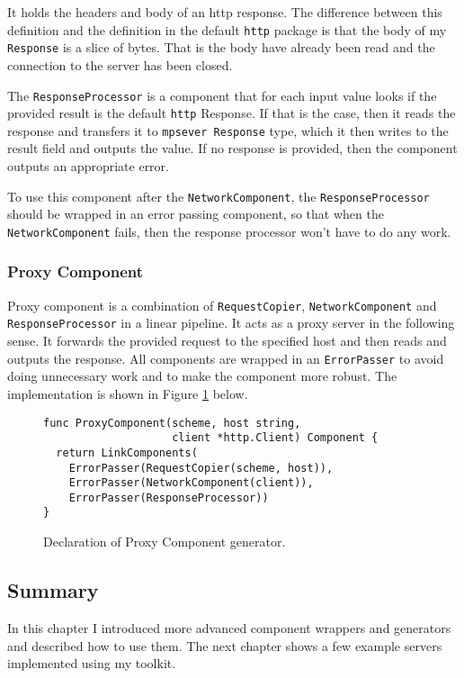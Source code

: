 It holds the headers and body of an http response. The difference between
this definition and the definition in the default \texttt{http} package is that
the body of my \texttt{Response} is a slice of bytes. 
That is the body have already been
read and the connection to the server has been closed.

The \texttt{ResponseProcessor} is a component that for each input value
looks if the provided result is the default \texttt{http} Response. 
If that is the case,
then it reads the response and transfers it to \texttt{mpsever Response} 
type, which it
then writes to the result field and outputs the value. If no response
is provided, then the component outputs an appropriate error.

To use this component after the \texttt{NetworkComponent}, 
the \texttt{ResponseProcessor}
should be wrapped in an error passing component, so that when the\\
\texttt{NetworkComponent} fails, then the response processor won't have to do
any work.

\subsubsection{Proxy Component}
Proxy component is a combination of \texttt{RequestCopier}, 
\texttt{NetworkComponent} 
and \texttt{ResponseProcessor} in a linear pipeline. It acts as a proxy server
in the following sense. It forwards the provided request to the specified
host and then reads and outputs the response. 
All components are wrapped
in an \texttt{ErrorPasser} to avoid doing unnecessary work and to make the component
more robust. The implementation is shown in Figure \ref{fig:ProxyComp} below.

\begin{figure}[h]
\centering
\begin{lstlisting}
func ProxyComponent(scheme, host string, 
                    client *http.Client) Component {
  return LinkComponents(
    ErrorPasser(RequestCopier(scheme, host)),
    ErrorPasser(NetworkComponent(client)),
    ErrorPasser(ResponseProcessor))
}
\end{lstlisting}
\caption[scale=1.0]{Declaration of Proxy Component generator.}
\label{fig:ProxyComp}
\end{figure}
\subsection{Summary}
In this chapter I introduced more advanced component wrappers and generators
and described how to use them. The next chapter shows a few example
servers implemented using my toolkit.

